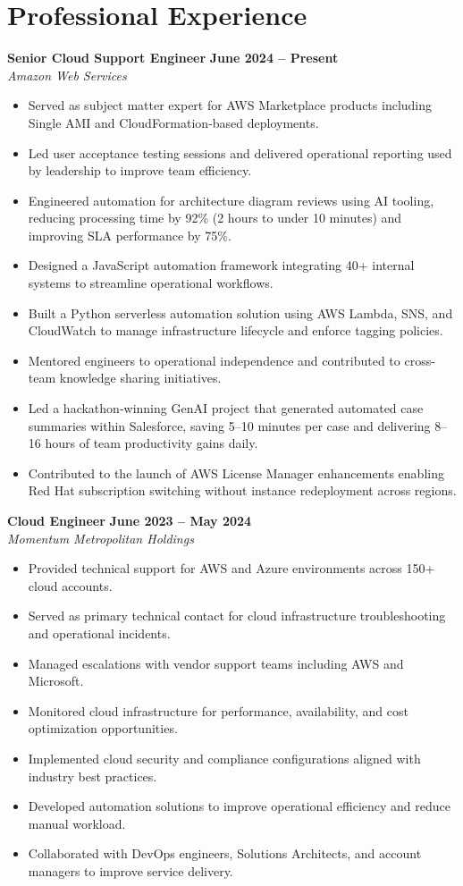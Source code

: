 \documentclass[11pt,a4paper]{article}
\begin{document}
\section{Professional Experience}

\textbf{Senior Cloud Support Engineer} \hfill \textbf{June 2024 -- Present}\\
\textit{Amazon Web Services}
\begin{itemize}
  \item Served as subject matter expert for AWS Marketplace products including Single AMI and CloudFormation-based deployments.
  \item Led user acceptance testing sessions and delivered operational reporting used by leadership to improve team efficiency.
  \item Engineered automation for architecture diagram reviews using AI tooling, reducing processing time by 92\% (2 hours to under 10 minutes) and improving SLA performance by 75\%.
  \item Designed a JavaScript automation framework integrating 40+ internal systems to streamline operational workflows.
  \item Built a Python serverless automation solution using AWS Lambda, SNS, and CloudWatch to manage infrastructure lifecycle and enforce tagging policies.
  \item Mentored engineers to operational independence and contributed to cross-team knowledge sharing initiatives.
  \item Led a hackathon-winning GenAI project that generated automated case summaries within Salesforce, saving 5--10 minutes per case and delivering 8--16 hours of team productivity gains daily.
  \item Contributed to the launch of AWS License Manager enhancements enabling Red Hat subscription switching without instance redeployment across regions.
\end{itemize}

\textbf{Cloud Engineer} \hfill \textbf{June 2023 -- May 2024}\\
\textit{Momentum Metropolitan Holdings}
\begin{itemize}
  \item Provided technical support for AWS and Azure environments across 150+ cloud accounts.
  \item Served as primary technical contact for cloud infrastructure troubleshooting and operational incidents.
  \item Managed escalations with vendor support teams including AWS and Microsoft.
  \item Monitored cloud infrastructure for performance, availability, and cost optimization opportunities.
  \item Implemented cloud security and compliance configurations aligned with industry best practices.
  \item Developed automation solutions to improve operational efficiency and reduce manual workload.
  \item Collaborated with DevOps engineers, Solutions Architects, and account managers to improve service delivery.
\end{itemize}
\end{document}
